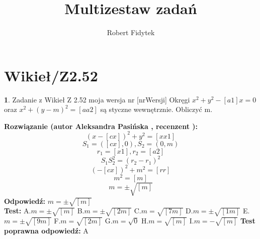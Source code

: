 \documentclass[12pt, a4paper]{article}
\title{Multizestaw zadań}
\author{Robert Fidytek}
\date{}
\theoremstyle{definition} %
\newtheorem{zad}{}
\newcommand{\kategoria}[1]{\section{#1}} %
\newcommand{\zadStart}[1]{\begin{zad}#1\newline} %
\newcommand{\zadStop}{\end{zad}}   %
\newcommand{\rozwStart}[2]{\noindent \textbf{Rozwiązanie (autor #1 , recenzent #2): }\newline} %
\newcommand{\rozwStop}{\newline}                                            %
\newcommand{\odpStart}{\noindent \textbf{Odpowiedź:}\newline}    %
\newcommand{\odpStop}{\newline}                                             %
\newcommand{\testStart}{\noindent \textbf{Test:}\newline} %
\newcommand{\testStop}{\newline} %
\newcommand{\kluczStart}{\noindent \textbf{Test poprawna odpowiedź:}\newline} %
\newcommand{\kluczStop}{\newline} %
\begin{document}
\maketitle


\kategoria{Wikieł/Z2.52}
\zadStart{Zadanie z Wikieł Z 2.52 moja wersja nr [nrWersji]}
Okręgi $x^2+y^2-[a1]x=0$ oraz $x^2+(y-m)^2=[aa2]$ są styczne wewnętrznie. Obliczyć m.
\zadStop
\rozwStart{Aleksandra Pasińska}{}
$$(x-[cx])^2+y^2=[xx1]$$
$$S_1=([cx],0), S_2=(0,m)$$
$$r_1=[x1], r_2=[a2]$$
$$S_1S_2^2=(r_2-r_1)^2$$
$$(-[cx])^2+m^2=[rr]$$
$$m^2=[m]$$
$$m=\pm \sqrt{[m]}$$
\rozwStop
\odpStart
$m=\pm \sqrt{[m]}$\\
\odpStop
\testStart
A.$m=\pm \sqrt{[m]}$
B.$m=\pm \sqrt{[2m]}$
C.$m=\sqrt{[7m]}$
D.$m=\pm \sqrt{[1m]}$
E.$m=\pm \sqrt{[9m]}$
F.$m= \sqrt{[2m]}$
G.$m=\sqrt{0}$
H.$m=\sqrt{[m]}$
I.$m=- \sqrt{[m]}$
\testStop
\kluczStart
A
\kluczStop
\end{document}
